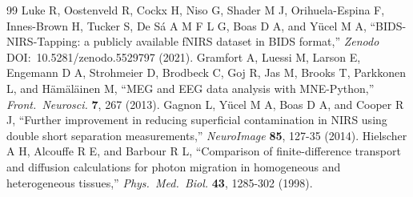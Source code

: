 \documentclass[11pt]{article}
\begin{document}
\begin{thebibliography}{99}
 Luke R, Oostenveld R, Cockx H, Niso G, Shader M J, Orihuela-Espina F, Innes-Brown H, Tucker S, De S\'a A M F L G, Boas D A, and Y\"ucel M A, ``BIDS-NIRS-Tapping: a publicly available fNIRS dataset in BIDS format,'' \textit{Zenodo} DOI:~10.5281/zenodo.5529797 (2021).
 Gramfort A, Luessi M, Larson E, Engemann D A, Strohmeier D, Brodbeck C, Goj R, Jas M, Brooks T, Parkkonen L, and H\"am\"al\"ainen M, ``MEG and EEG data analysis with MNE-Python,'' \textit{Front.\ Neurosci.} \textbf{7}, 267 (2013).
 Gagnon L, Y\"ucel M A, Boas D A, and Cooper R J, ``Further improvement in reducing superficial contamination in NIRS using double short separation measurements,'' \textit{NeuroImage} \textbf{85}, 127-35 (2014).
 Hielscher A H, Alcouffe R E, and Barbour R L, ``Comparison of finite-difference transport and diffusion calculations for photon migration in homogeneous and heterogeneous tissues,'' \textit{Phys.\ Med.\ Biol.} \textbf{43}, 1285-302 (1998).
\end{thebibliography}
\end{document}
